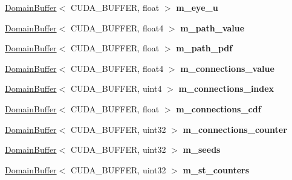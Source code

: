\begin{DoxyCompactItemize}
\hyperlink{class_domain_buffer}{Domain\+Buffer}$<$ C\+U\+D\+A\+\_\+\+B\+U\+F\+F\+ER, float $>$ {\bfseries m\+\_\+eye\+\_\+u}
\item 
\mbox{\label{struct_c_m_l_t_a8f679c6206877154cb9ab79648e83fd5}} 
\hyperlink{class_domain_buffer}{Domain\+Buffer}$<$ C\+U\+D\+A\+\_\+\+B\+U\+F\+F\+ER, float4 $>$ {\bfseries m\+\_\+path\+\_\+value}
\item 
\mbox{\label{struct_c_m_l_t_ac0f66c7e5408b1a3f2bb3795bc65008a}} 
\hyperlink{class_domain_buffer}{Domain\+Buffer}$<$ C\+U\+D\+A\+\_\+\+B\+U\+F\+F\+ER, float $>$ {\bfseries m\+\_\+path\+\_\+pdf}
\item 
\mbox{\label{struct_c_m_l_t_aa68cde09c47f6594100ea36708eafbd9}} 
\hyperlink{class_domain_buffer}{Domain\+Buffer}$<$ C\+U\+D\+A\+\_\+\+B\+U\+F\+F\+ER, float4 $>$ {\bfseries m\+\_\+connections\+\_\+value}
\item 
\mbox{\label{struct_c_m_l_t_a0f08e9cad3b6cca088885253662edf76}} 
\hyperlink{class_domain_buffer}{Domain\+Buffer}$<$ C\+U\+D\+A\+\_\+\+B\+U\+F\+F\+ER, uint4 $>$ {\bfseries m\+\_\+connections\+\_\+index}
\item 
\mbox{\label{struct_c_m_l_t_a9ce9688c7e25c7f6087742dffd10545b}} 
\hyperlink{class_domain_buffer}{Domain\+Buffer}$<$ C\+U\+D\+A\+\_\+\+B\+U\+F\+F\+ER, float $>$ {\bfseries m\+\_\+connections\+\_\+cdf}
\item 
\mbox{\label{struct_c_m_l_t_ac702a583341549e1ce0de60be3214396}} 
\hyperlink{class_domain_buffer}{Domain\+Buffer}$<$ C\+U\+D\+A\+\_\+\+B\+U\+F\+F\+ER, uint32 $>$ {\bfseries m\+\_\+connections\+\_\+counter}
\item 
\mbox{\label{struct_c_m_l_t_a5ea319405e28fe51741f330e3893fb29}} 
\hyperlink{class_domain_buffer}{Domain\+Buffer}$<$ C\+U\+D\+A\+\_\+\+B\+U\+F\+F\+ER, uint32 $>$ {\bfseries m\+\_\+seeds}
\item 
\mbox{\label{struct_c_m_l_t_a644d2eb1f3292193ad7903886064b637}} 
\hyperlink{class_domain_buffer}{Domain\+Buffer}$<$ C\+U\+D\+A\+\_\+\+B\+U\+F\+F\+ER, uint32 $>$ {\bfseries m\+\_\+st\+\_\+counters}
\item 

\end{DoxyCompactItemize}
